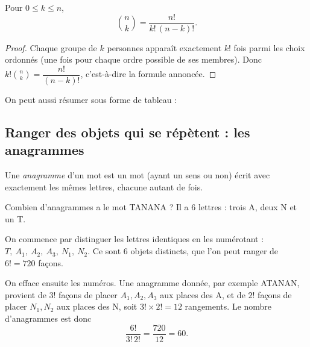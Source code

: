 \documentclass[11pt]{article}
\begin{document}
\begin{proposition}\label{prop:formule-binomial}
Pour \(0\le k\le n\),
\[
\binom{n}{k}=\frac{n!}{k!\,(n-k)!}.
\]
\end{proposition}

\begin{proof}
Chaque groupe de \(k\) personnes apparaît exactement \(k!\) fois parmi les choix ordonnés
(une fois pour chaque ordre possible de ses membres). Donc
\(k!\binom{n}{k}=\dfrac{n!}{(n-k)!}\), c'est-à-dire la formule annoncée.
\end{proof}

On peut aussi résumer sous forme de tableau :

\begin{center}
\end{center}

\subsection{Ranger des objets qui se répètent : les anagrammes}\label{sec:anagrammes}

\begin{definition}[Anagramme]\label{def:anagramme}
Une \emph{anagramme} d’un mot est un mot (ayant un sens ou non) écrit avec exactement les
mêmes lettres, chacune autant de fois.
\end{definition}

\begin{exemple}
Combien d’anagrammes a le mot TANANA ? Il a \(6\) lettres : trois A, deux N et un T.
\end{exemple}

\begin{solution}
On commence par distinguer les lettres identiques en les numérotant :
\(T,\ A_1,\ A_2,\ A_3,\ N_1,\ N_2\). Ce sont \(6\) objets distincts, que l’on peut ranger de
\(6!=720\) façons.

On efface ensuite les numéros. Une anagramme donnée, par exemple ATANAN, provient de
\(3!\) façons de placer \(A_1,A_2,A_3\) aux places des A, et de \(2!\) façons de placer
\(N_1,N_2\) aux places des N, soit \(3!\times 2!=12\) rangements. Le nombre d’anagrammes est donc
\[
\frac{6!}{3!\,2!}=\frac{720}{12}=60.
\]
\end{solution}
\end{document}
